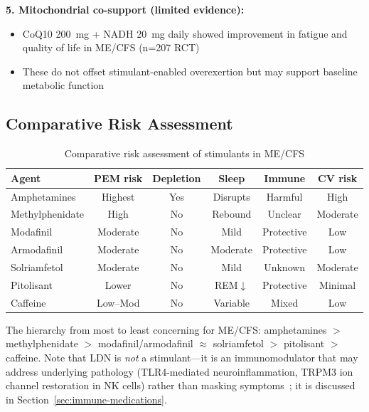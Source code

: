 \begin{protocol}
\textbf{5. Mitochondrial co-support (limited evidence):}
\begin{itemize}
    \item CoQ10 200~mg + NADH 20~mg daily showed improvement in fatigue and quality of life in ME/CFS (n=207 RCT)~\cite{Castro2015coq10nadh}
    \item These do not offset stimulant-enabled overexertion but may support baseline metabolic function
\end{itemize}
\end{protocol}

\subsection{Comparative Risk Assessment}
\label{subsec:stimulant-comparison}

\begin{table}[htbp]
\centering
\small
\caption{Comparative risk assessment of stimulants in ME/CFS}
\label{tab:stimulant-risk}
\begin{tabular}{lccccc}
\hline
\textbf{Agent} & \textbf{PEM risk} & \textbf{Depletion} & \textbf{Sleep} & \textbf{Immune} & \textbf{CV risk} \\
\hline
Amphetamines & Highest & Yes & Disrupts & Harmful & High \\
Methylphenidate & High & No & Rebound & Unclear & Moderate \\
Modafinil & Moderate & No & Mild & Protective & Low \\
Armodafinil & Moderate & No & Moderate & Protective & Low \\
Solriamfetol & Moderate & No & Mild & Unknown & Moderate \\
Pitolisant & Lower & No & REM$\downarrow$ & Protective & Minimal \\
Caffeine & Low--Mod & No & Variable & Mixed & Low \\
\hline
\end{tabular}
\end{table}

The hierarchy from most to least concerning for ME/CFS: amphetamines $>$ methylphenidate $>$ modafinil/armodafinil $\approx$ solriamfetol $>$ pitolisant $>$ caffeine. Note that LDN is \textit{not} a stimulant---it is an immunomodulator that may address underlying pathology (TLR4-mediated neuroinflammation, TRPM3 ion channel restoration in NK cells) rather than masking symptoms~\cite{Cabanas2021,Cabanas2025trpm3}; it is discussed in Section~\ref{sec:immune-medications}.


